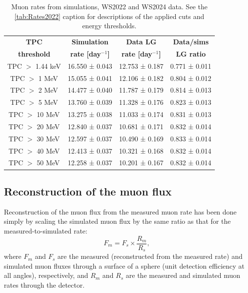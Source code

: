 \begin{center}
\begin{minipage}{\textwidth}
\def\arraystretch{1.4}%
\centering
\begin{longtable}[hbtp]{|c|c|c|c|}
\caption{Muon rates from simulations, WS2022 and WS2024 data. See the \autoref{tab:Rates2022} caption for descriptions of the applied cuts and energy thresholds. \newline}
\label{tab:Rates_all}\\
\hline
\multicolumn{1}{|c|}{\textbf{TPC}} & \multicolumn{1}{c|}{\textbf{Simulation}} & \multicolumn{1}{c|}{\textbf{Data LG}} & \multicolumn{1}{c|}{\textbf{Data/sims}}  \\ 
\multicolumn{1}{|c|}{\textbf{threshold}} & \multicolumn{1}{c|}{\textbf{rate [day$^{-1}$]}} & \multicolumn{1}{c|}{\textbf{rate [day$^{-1}$]}} & \multicolumn{1}{c|}{\textbf{LG ratio}}  \\ \hline 
\endfirsthead \hline
\endlastfoot
TPC $>$ 1.44 keV & 16.550 ± 0.043 & 12.753 ± 0.187 & 0.771 ± 0.011 \\ \hline
TPC $>$ 1 MeV & 15.055 ± 0.041 & 12.106 ± 0.182 & 0.804 ± 0.012\\ \hline
TPC $>$ 2 MeV & 14.477 ± 0.040 & 11.787 ± 0.179 & 0.814 ± 0.013 \\ \hline
TPC $>$ 5 MeV & 13.760 ± 0.039 & 11.328 ± 0.176 & 0.823 ± 0.013  \\ \hline
TPC $>$ 10 MeV & 13.275 ± 0.038 & 11.033 ± 0.174 & 0.831 ± 0.013 \\ \hline
TPC $>$ 20 MeV & 12.840 ± 0.037 & 10.681 ± 0.171 & 0.832 ± 0.014  \\ \hline
TPC $>$ 30 MeV & 12.597 ± 0.037 & 10.490 ± 0.169 & 0.833 ± 0.014  \\ \hline
TPC $>$ 40 MeV & 12.413 ± 0.037 & 10.321 ± 0.168 & 0.832 ± 0.014  \\ \hline
TPC $>$ 50 MeV & 12.258 ± 0.037 & 10.201 ± 0.167 & 0.832 ± 0.014 \\
\hline
\end{longtable}
\end{minipage}%
\end{center}

\subsection{Reconstruction of the muon flux}\label{sec:Muons/MuonFluxReconstruction}
Reconstruction of the muon flux from the measured muon rate has been done simply by scaling the simulated muon flux by the same ratio as that for the measured-to-simulated rate:
\begin{equation}
    F_{m} = F_{s} \times \frac{R_m}{R_s},
\label{eq:flux}
\end{equation}
where $F_{m}$ and $F_{s}$ are the measured (reconstructed from the measured rate) and simulated muon fluxes through a surface of a sphere (unit detection efficiency at all angles), respectively, and $R_{m}$ and $R_{s}$ are the measured and simulated muon rates through the detector.

